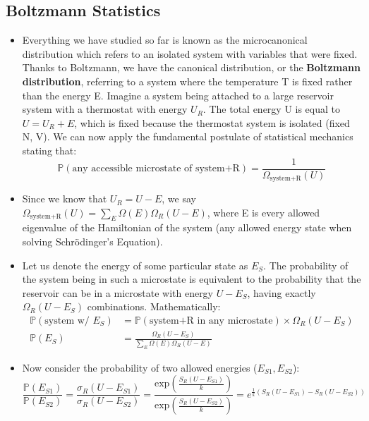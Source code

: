 \documentclass[12pt, letterpaper, twoside]{article}
\begin{document}
\subsection{Boltzmann Statistics}
\begin{itemize}
    \item Everything we have studied so far is known as the microcanonical distribution which refers to an isolated system with variables that were fixed. Thanks to Boltzmann, we have the canonical distribution, or the \textbf{Boltzmann distribution}, referring to a system where the temperature T is fixed rather than the energy E. Imagine a system being attached to a large reservoir system with a thermostat with energy $U_R$. The total energy U is equal to $U = U_R + E$, which is fixed because the thermostat system is isolated (fixed N, V). We can now apply the fundamental postulate of statistical mechanics stating that:
    \begin{equation*}
        \mathbb{P}(\text{any accessible microstate of system+R}) = \frac{1}{\Omega_{\text{system+R}}(U)}
    \end{equation*}
    \item Since we know that $U_R = U - E$, we say $\Omega_{\text{system+R}}(U) = \sum_E\Omega(E)\Omega_R(U - E)$, where E is every allowed eigenvalue of the Hamiltonian of the system (any allowed energy state when solving Schr\"{o}dinger's Equation). 
    \item Let us denote the energy of some particular state as $E_S$. The probability of the system being in such a microstate is equivalent to the probability that the reservoir can be in a microstate with energy $U - E_S$,  having exactly $\Omega_R(U - E_S)$ combinations. Mathematically:
    \begin{align*}
        \mathbb{P}(\text{system w/ } E_S) &= \mathbb{P}(\text{system+R in any microstate}) \times \Omega_R(U - E_S) \\
        \mathbb{P}(E_S) &= \frac{\Omega_R(U - E_S)}{\sum_E\Omega(E)\Omega_R(U - E)}
    \end{align*}
    \item Now consider the probability of two allowed energies ($E_{S1}, E_{S2}$):
    \begin{equation*}
        \frac{\mathbb{P}(E_{S1})}{\mathbb{P}(E_{S2})} = \frac{\sigma_R(U-E_{S1})}{\sigma_R(U-E_{S2})} = \frac{\text{exp}(\frac{S_R(U-E_{S1})}{k})}{\text{exp}(\frac{S_R(U-E_{S2})}{k})} = e^{\frac{1}{k}(S_R(U-E_{S1}) - S_R(U-E_{S2}))}
    \end{equation*}

\end{itemize}
\end{document}
